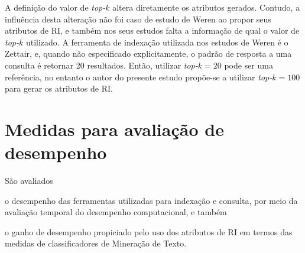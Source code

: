     
    A definição do valor de \textit{top-$k$} altera diretamente os atributos gerados. 
    Contudo, a influência desta alteração não foi caso de estudo de Weren ao propor seus atributos de RI, e também nos seus estudos falta a informação de qual o valor de \textit{top-$k$} utilizado.
    A ferramenta de indexação utilizada nos estudos de Weren é o Zettair, e, quando não especificado explicitamente, o padrão de resposta a uma consulta é retornar 20 resultados.
    Então, utilizar \textit{top-$k = 20$} pode ser uma referência, no entanto o autor do presente estudo propõe-se a utilizar \textit{top-$k = 100$} para gerar os atributos de RI.
    
    



\section{Medidas para avaliação de desempenho}  \label{sec:Medidas-para-avaliação-de-desempenho}
    São avaliados
    \begin{enumerate*}[label=(\alph*)]
        \item o desempenho das ferramentas utilizadas para indexação e consulta, por meio da avaliação temporal do desempenho computacional, e também
        \item o ganho de desempenho propiciado pelo uso dos atributos de RI em termos das medidas de classificadores de Mineração de Texto. %
    \end{enumerate*} 
    
